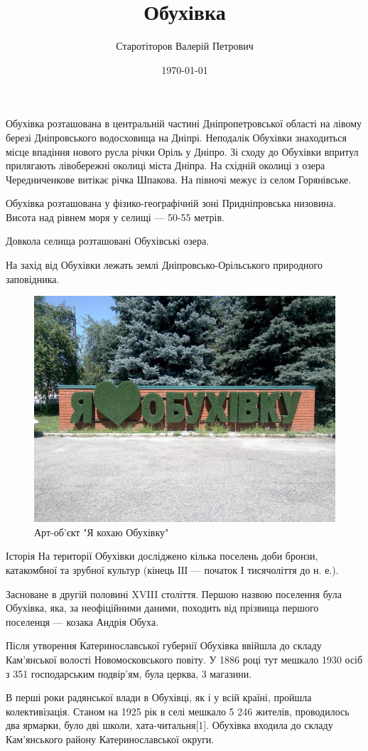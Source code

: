 \documentclass[12pt]{article} %
\title{Обухівка}
\date{\today}
\author{Старотіторов Валерій Петрович }
\begin{document}
	\maketitle	              
	
Обухівка розташована в центральній частині Дніпропетровської області на лівому березі Дніпровського водосховища на Дніпрі. Неподалік Обухівки знаходиться місце впадіння нового русла річки Оріль у Дніпро. Зі сходу до Обухівки впритул прилягають лівобережні околиці міста Дніпра. На східній околиці з озера Чередниченкове витікає річка Шпакова. На півночі межує із селом Горянівське.

Обухівка розташована у фізико-географічній зоні Придніпровська низовина. Висота над рівнем моря у селищі — 50-55 метрів.

Довкола селища розташовані Обухівські озера.

На захід від Обухівки лежать землі Дніпровсько-Орільського природного заповідника.
\begin{figure}
	\centering
	\includegraphics[width=0.7\linewidth]{25}
	\caption{Арт-об'єкт "Я кохаю Обухівку"}
	\label{fig:25}
\end{figure}


Історія
На території Обухівки досліджено кілька поселень доби бронзи, катакомбної та зрубної культур (кінець ІІІ — початок І тисячоліття до н. е.).

Засноване в другій половині XVIII століття. Першою назвою поселення була Обухівка, яка, за неофіційними даними, походить від прізвища першого поселенця — козака Андрія Обуха.

Після утворення Катеринославської губернії Обухівка ввійшла до складу Кам'янської волості Новомосковського повіту. У 1886 році тут мешкало 1930 осіб з 351 господарським подвір'ям, була церква, 3 магазини.

В перші роки радянської влади в Обухівці, як і у всій країні, пройшла колективізація. Станом на 1925 рік в селі мешкало 5 246 жителів, проводилось два ярмарки, було дві школи, хата-читальня[1]. Обухівка входила до складу Кам'янського району Катеринославської округи.
\end{document}
